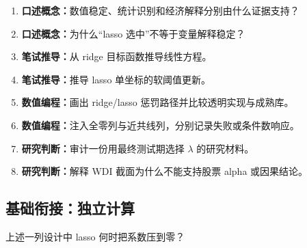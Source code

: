 \begin{enumerate}[leftmargin=*]
  \item \textbf{口述概念：}数值稳定、统计识别和经济解释分别由什么证据支持？
  \item \textbf{口述概念：}为什么“lasso 选中”不等于变量解释稳定？
  \item \textbf{笔试推导：}从 ridge 目标函数推导线性方程。
  \item \textbf{笔试推导：}推导 lasso 单坐标的软阈值更新。
  \item \textbf{数值编程：}画出 ridge/lasso 惩罚路径并比较透明实现与成熟库。
  \item \textbf{数值编程：}注入全零列与近共线列，分别记录失败或条件数响应。
  \item \textbf{研究判断：}审计一份用最终测试期选择 $\lambda$ 的研究材料。
  \item \textbf{研究判断：}解释 WDI 截面为什么不能支持股票 alpha 或因果结论。
\end{enumerate}

\subsection*{基础衔接：独立计算}
上述一列设计中 lasso 何时把系数压到零？
